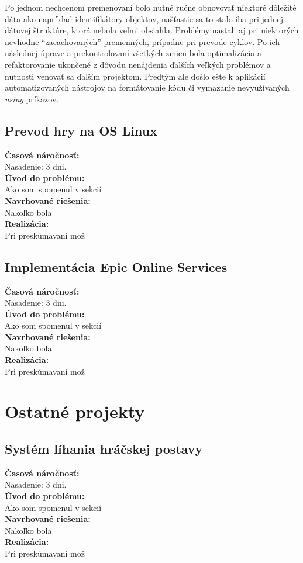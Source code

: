 \documentclass[slovak, bachelorpractice]{diploma}
\begin{document}
Po jednom nechcenom premenovaní bolo nutné ručne obnovovať niektoré dôležité dáta ako napríklad identifikátory objektov, našťastie sa to stalo iba pri jednej dátovej štruktúre, ktorá nebola veľmi obsiahla. Problémy nastali aj pri niektorých nevhodne \enquote{zacachovaných} premenných, prípadne pri prevode cyklov. Po ich následnej úprave a prekontrolovaní všetkých zmien bola optimalizácia a refaktorovanie ukončené z dôvodu nenájdenia ďalších veľkých problémov a nutnosti venovať sa ďalším projektom. Predtým ale došlo ešte k aplikácií automatizovaných nástrojov na formátovanie kódu či vymazanie nevyužívaných \textit{using} príkazov.

\subsection{Prevod hry na OS Linux}
\label{sec:linux}
\textbf{Časová náročnosť:} \\ Nasadenie: 3 dni.\\
\textbf{Úvod do problému:} \\ Ako som spomenul v sekcií \\
\textbf{Navrhované riešenia:} \\ Nakoľko bola \\
\textbf{Realizácia:} \\ Pri preskúmavaní mož
\subsection{Implementácia Epic Online Services}
\label{sec:implEOS}
\textbf{Časová náročnosť:} \\ Nasadenie: 3 dni.\\
\textbf{Úvod do problému:} \\ Ako som spomenul v sekcií \\
\textbf{Navrhované riešenia:} \\ Nakoľko bola \\
\textbf{Realizácia:} \\ Pri preskúmavaní mož

\section{Ostatné projekty}
\label{sec:Others}
\subsection{Systém líhania hráčskej postavy}
\label{sec:sleep}
\textbf{Časová náročnosť:} \\ Nasadenie: 3 dni.\\
\textbf{Úvod do problému:} \\ Ako som spomenul v sekcií \\
\textbf{Navrhované riešenia:} \\ Nakoľko bola \\
\textbf{Realizácia:} \\ Pri preskúmavaní mož
\end{document}
